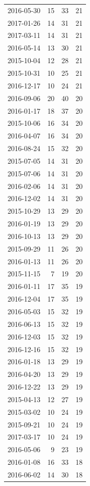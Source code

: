 \begin{tabular}{lrrr}
2016-05-30 & 15 & 33 & 21 \\
2017-01-26 & 14 & 31 & 21 \\
2017-03-11 & 14 & 31 & 21 \\
2016-05-14 & 13 & 30 & 21 \\
2015-10-04 & 12 & 28 & 21 \\
2015-10-31 & 10 & 25 & 21 \\
2016-12-17 & 10 & 24 & 21 \\
2016-09-06 & 20 & 40 & 20 \\
2016-01-17 & 18 & 37 & 20 \\
2015-10-06 & 16 & 34 & 20 \\
2016-04-07 & 16 & 34 & 20 \\
2016-08-24 & 15 & 32 & 20 \\
2015-07-05 & 14 & 31 & 20 \\
2015-07-06 & 14 & 31 & 20 \\
2016-02-06 & 14 & 31 & 20 \\
2016-12-02 & 14 & 31 & 20 \\
2015-10-29 & 13 & 29 & 20 \\
2016-01-19 & 13 & 29 & 20 \\
2016-10-13 & 13 & 29 & 20 \\
2015-09-29 & 11 & 26 & 20 \\
2016-01-13 & 11 & 26 & 20 \\
2015-11-15 & 7 & 19 & 20 \\
2016-01-11 & 17 & 35 & 19 \\
2016-12-04 & 17 & 35 & 19 \\
2016-05-03 & 15 & 32 & 19 \\
2016-06-13 & 15 & 32 & 19 \\
2016-12-03 & 15 & 32 & 19 \\
2016-12-16 & 15 & 32 & 19 \\
2016-01-18 & 13 & 29 & 19 \\
2016-04-20 & 13 & 29 & 19 \\
2016-12-22 & 13 & 29 & 19 \\
2015-04-13 & 12 & 27 & 19 \\
2015-03-02 & 10 & 24 & 19 \\
2015-09-21 & 10 & 24 & 19 \\
2017-03-17 & 10 & 24 & 19 \\
2016-05-06 & 9 & 23 & 19 \\
2016-01-08 & 16 & 33 & 18 \\
2016-06-02 & 14 & 30 & 18 \\

\end{tabular}
